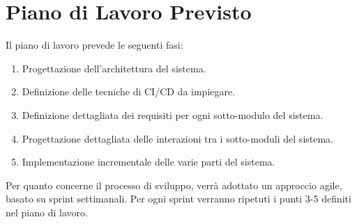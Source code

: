 \documentclass[12pt,a4paper,openright,twoside]{book}
\begin{document}
\chapter{Piano di Lavoro Previsto}
\label{chap:expectedWorkPlan}

Il piano di lavoro prevede le seguenti fasi:

\begin{enumerate}
    \item Progettazione dell'architettura del sistema.
    \item Definizione delle tecniche di CI/CD da impiegare.
    \item Definizione dettagliata dei requisiti per ogni sotto-modulo del sistema.
    \item Progettazione dettagliata delle interazioni tra i sotto-moduli del sistema.
    \item Implementazione incrementale delle varie parti del sistema.
\end{enumerate}

Per quanto concerne il processo di sviluppo, verrà adottato un approccio agile, basato su sprint settimanali. Per ogni sprint verranno ripetuti i punti 3-5 definiti nel piano di lavoro.


%
%
\end{document}
